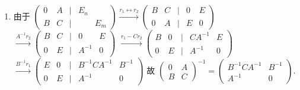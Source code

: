 \begin{enumerate}
			 \item %
			       由于 $\begin{pmatrix}
					       0 & A & | & E_n       \\
					       B & C & | &     & E_m
				       \end{pmatrix} \xrightarrow{r_1 \leftrightarrow r_2} \begin{pmatrix}
					       B & C & | & 0 & E \\
					       0 & A & | & E & 0
				       \end{pmatrix}$
			       $\xrightarrow{A^{-1}r_2} \begin{pmatrix}
					       B & C & | & 0      & E \\
					       0 & E & | & A^{-1} & 0
				       \end{pmatrix}$
			       $\xrightarrow{r_1 - Cr_2} \begin{pmatrix}
					       B & 0 & | & CA^{-1} & E \\
					       0 & E & | & A^{-1}  & 0
				       \end{pmatrix}$
			       $\xrightarrow{B^{-1}r_1} \begin{pmatrix}
					       E & 0 & | & B^{-1}CA^{-1} & B^{-1} \\
					       0 & E & | & A^{-1}        & 0
				       \end{pmatrix}$
			       故 $\begin{pmatrix}
					       0 & A \\
					       B & C
				       \end{pmatrix}^{-1} = \begin{pmatrix}
					       B^{-1}CA^{-1} & B^{-1} \\
					       A^{-1}        & 0
				       \end{pmatrix}$.
		 \end{enumerate}


 \subsection{} %


